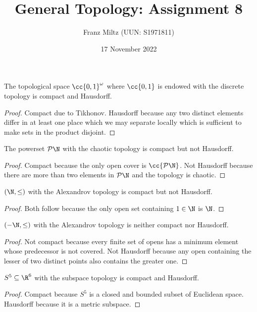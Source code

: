 \documentclass{article}
\begin{document}
\title{General Topology: Assignment 8}
\author{Franz Miltz (UUN: S1971811)}
\date{17 November 2022}
\maketitle

\begin{claim*}
  The topological space $\cc{0,1}^\omega$ where $\cc{0,1}$ is endowed with the discrete
  topology is compact and Hausdorff.
  \begin{proof}
    Compact due to Tikhonov. Hausdorff because any two distinct elements differ in at
    least one place which we may separate locally which is sufficient to make
    sets in the product disjoint.
  \end{proof}
\end{claim*}

\begin{claim*}
  The powerset $\mathcal P\N$ with the chaotic topology is compact but not Hausdorff.
  \begin{proof}
    Compact because the only open cover is $\cc{\mathcal P\N}$. Not Hausdorff because there
    are more than two elements in $\mathcal P\N$ and the topology is chaotic.
  \end{proof}
\end{claim*}

\begin{claim*}
  $(\N, \leq)$ with the Alexandrov topology is compact but not Hausdorff.
  \begin{proof}
    Both follow because the only open set containing $1\in\N$ is $\N$.
  \end{proof}
\end{claim*}

\begin{claim*}
  $(-\N, \leq)$ with the Alexandrov topology is neither compact nor Hausdorff.
  \begin{proof}
    Not compact because every finite set of opens has a minimum element whose predecessor
    is not covered. Not Hausdorff because any open containing the lesser of two distinct
    points also contains the greater one.
  \end{proof}
\end{claim*}

\begin{claim*}
  $S^5\subseteq\R^6$ with the subspace topology is compact and Hausdorff.
  \begin{proof}
    Compact because $S^5$ is a closed and bounded subset of Euclidean space. Hausdorff
    because it is a metric subspace.
  \end{proof}
\end{claim*}
\end{document}
